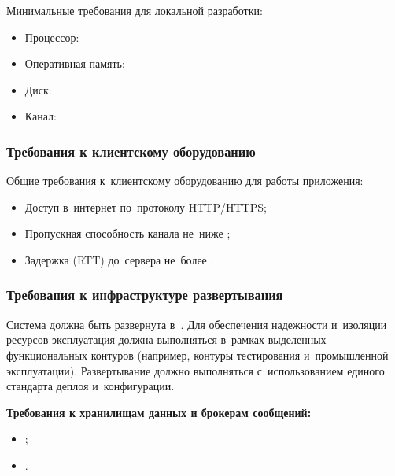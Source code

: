 \documentclass[12pt,a4paper]{extarticle}
\begin{document}
Минимальные требования для локальной разработки:

\begin{itemize}[leftmargin=1.25cm]
\item Процессор: 
\item Оперативная память: 
\item Диск: 
\item Канал: 
\end{itemize}

\subsubsection{Требования к клиентскому оборудованию}

Общие требования к~клиентскому оборудованию для работы приложения:

\begin{itemize}[leftmargin=1.25cm]
\item Доступ в~интернет по~протоколу HTTP/HTTPS;
\item Пропускная способность канала не~ниже ;
\item Задержка (RTT) до~сервера не~более .
\end{itemize}

\subsubsection{Требования к инфраструктуре развертывания}
\label{sec:deployment_infra}

Система должна быть развернута в~. Для обеспечения надежности и~изоляции ресурсов эксплуатация должна выполняться в~рамках выделенных функциональных контуров (например, контуры тестирования и~промышленной эксплуатации). Развертывание должно выполняться с~использованием единого стандарта деплоя и~конфигурации.

\textbf{Требования к хранилищам данных и брокерам сообщений:}

\begin{itemize}[leftmargin=1.25cm]
\item {};
\item {}.
\end{itemize}
\end{document}
